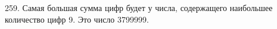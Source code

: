 259. Самая большая сумма цифр будет у числа, содержащего наибольшее количество цифр 9. Это число 3799999.\\
